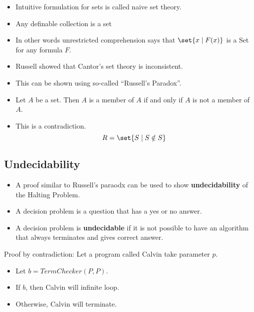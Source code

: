 \documentclass[8pt]{scrreprt}
\begin{document}
\begin{landscape}
\begin{multicols*}{3}
\begin{itemize}
	\item Intuitive formulation for sets is called naive set theory.
	\item Any definable collection is a set
	\item In other words unrestricted comprehension says that $\set{x\mid F(x)}$ is a Set
	for any formula $F$.
	\item Russell showed that Cantor's set theory is inconsistent.
	\item This can be shown using so-called ``Russell's Paradox''.
\end{itemize}

\begin{definition}
	\begin{itemize}
		\item Let $A$ be a set. Then $A$ is a member of $A$ if and only if $A$ is not a member of $A$.
		\item This is a contradiction.
		\[
			R = \set{S \mid S \notin S}
		\]
	\end{itemize}
\end{definition}

\subsection{Undecidability}
\begin{itemize}
	\item A proof similar to Russell's paraodx can be used to show \textbf{undecidability} of the Halting Problem.
	\item A decision problem is a question that has a yes or no answer.
	\item A decision problem is \textbf{undecidable} if it is not possible to have
	an algorithm that always terminates and gives correct answer.
\end{itemize}

\begin{theorem}
	Proof by contradiction: Let a program called Calvin take parameter $p$.

	\begin{itemize}
		\item Let $b=TermChecker(P, P)$.
		\item If $b$, then Calvin will infinite loop.
		\item Otherwise, Calvin will terminate.
	\end{itemize}


\end{theorem}
\end{multicols*}
\end{landscape}
\end{document}
